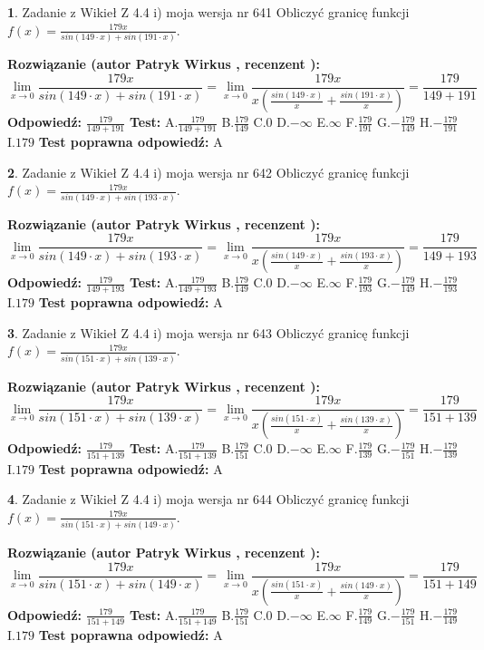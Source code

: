 \documentclass[12pt, a4paper]{article}
\theoremstyle{definition} %
\newtheorem{zad}{}
\newcommand{\zadStart}[1]{\begin{zad}#1\newline}
\newcommand{\zadStop}{\end{zad}}
\newcommand{\rozwStart}[2]{\noindent \textbf{Rozwiązanie (autor #1 , recenzent #2): }\newline}
\newcommand{\rozwStop}{\newline}
\newcommand{\odpStart}{\noindent \textbf{Odpowiedź:}\newline}
\newcommand{\odpStop}{\newline}
\newcommand{\testStart}{\noindent \textbf{Test:}\newline}
\newcommand{\testStop}{\newline}
\newcommand{\kluczStart}{\noindent \textbf{Test poprawna odpowiedź:}\newline}
\newcommand{\kluczStop}{\newline}
\begin{document}
\zadStart{Zadanie z Wikieł Z 4.4 i) moja wersja nr 641}
Obliczyć granicę funkcji $f(x)=\frac{179x}{sin(149\cdot x) +sin(191\cdot x)}$.
\zadStop
\rozwStart{Patryk Wirkus}{}
$$\lim\limits_{x\to 0}\frac{179x}{sin(149\cdot x) +sin(191\cdot x)}=\lim\limits_{x\to 0}\frac{179x}{x(\frac{sin(149\cdot x)}{x}+\frac{sin(191\cdot x)}{x})}=\frac{179}{149+191}$$
\rozwStop
\odpStart
$\frac{179}{149+191}$
\odpStop
\testStart
A.$\frac{179}{149+191}$
B.$\frac{179}{149}$
C.$0$
D.$-\infty$
E.$\infty$
F.$\frac{179}{191}$
G.$-\frac{179}{149}$
H.$-\frac{179}{191}$
I.$179$
\testStop
\kluczStart
A
\kluczStop



\zadStart{Zadanie z Wikieł Z 4.4 i) moja wersja nr 642}
Obliczyć granicę funkcji $f(x)=\frac{179x}{sin(149\cdot x) +sin(193\cdot x)}$.
\zadStop
\rozwStart{Patryk Wirkus}{}
$$\lim\limits_{x\to 0}\frac{179x}{sin(149\cdot x) +sin(193\cdot x)}=\lim\limits_{x\to 0}\frac{179x}{x(\frac{sin(149\cdot x)}{x}+\frac{sin(193\cdot x)}{x})}=\frac{179}{149+193}$$
\rozwStop
\odpStart
$\frac{179}{149+193}$
\odpStop
\testStart
A.$\frac{179}{149+193}$
B.$\frac{179}{149}$
C.$0$
D.$-\infty$
E.$\infty$
F.$\frac{179}{193}$
G.$-\frac{179}{149}$
H.$-\frac{179}{193}$
I.$179$
\testStop
\kluczStart
A
\kluczStop



\zadStart{Zadanie z Wikieł Z 4.4 i) moja wersja nr 643}
Obliczyć granicę funkcji $f(x)=\frac{179x}{sin(151\cdot x) +sin(139\cdot x)}$.
\zadStop
\rozwStart{Patryk Wirkus}{}
$$\lim\limits_{x\to 0}\frac{179x}{sin(151\cdot x) +sin(139\cdot x)}=\lim\limits_{x\to 0}\frac{179x}{x(\frac{sin(151\cdot x)}{x}+\frac{sin(139\cdot x)}{x})}=\frac{179}{151+139}$$
\rozwStop
\odpStart
$\frac{179}{151+139}$
\odpStop
\testStart
A.$\frac{179}{151+139}$
B.$\frac{179}{151}$
C.$0$
D.$-\infty$
E.$\infty$
F.$\frac{179}{139}$
G.$-\frac{179}{151}$
H.$-\frac{179}{139}$
I.$179$
\testStop
\kluczStart
A
\kluczStop



\zadStart{Zadanie z Wikieł Z 4.4 i) moja wersja nr 644}
Obliczyć granicę funkcji $f(x)=\frac{179x}{sin(151\cdot x) +sin(149\cdot x)}$.
\zadStop
\rozwStart{Patryk Wirkus}{}
$$\lim\limits_{x\to 0}\frac{179x}{sin(151\cdot x) +sin(149\cdot x)}=\lim\limits_{x\to 0}\frac{179x}{x(\frac{sin(151\cdot x)}{x}+\frac{sin(149\cdot x)}{x})}=\frac{179}{151+149}$$
\rozwStop
\odpStart
$\frac{179}{151+149}$
\odpStop
\testStart
A.$\frac{179}{151+149}$
B.$\frac{179}{151}$
C.$0$
D.$-\infty$
E.$\infty$
F.$\frac{179}{149}$
G.$-\frac{179}{151}$
H.$-\frac{179}{149}$
I.$179$
\testStop
\kluczStart
A
\kluczStop
\end{document}
